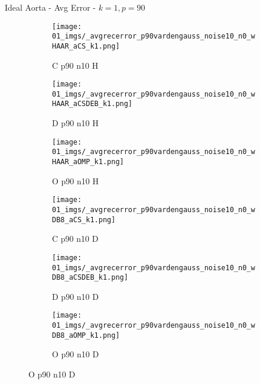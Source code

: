 \begin{frame}{Ideal Aorta - Avg Error - $k=1,p=90$}{}
\begin{figure}
\begin{subfigure}{0.13\textwidth}
\texttt{[image: 01\_imgs/\_avgrecerror\_p90vardengauss\_noise10\_n0\_wHAAR\_aCS\_k1.png]}
\caption*{\tiny C p90 n10 H}
\end{subfigure}
\begin{subfigure}{0.13\textwidth}
\texttt{[image: 01\_imgs/\_avgrecerror\_p90vardengauss\_noise10\_n0\_wHAAR\_aCSDEB\_k1.png]}
\caption*{\tiny D p90 n10 H}
\end{subfigure}
\begin{subfigure}{0.13\textwidth}
\texttt{[image: 01\_imgs/\_avgrecerror\_p90vardengauss\_noise10\_n0\_wHAAR\_aOMP\_k1.png]}
\caption*{\tiny O p90 n10 H}
\end{subfigure}
\begin{subfigure}{0.13\textwidth}
\texttt{[image: 01\_imgs/\_avgrecerror\_p90vardengauss\_noise10\_n0\_wDB8\_aCS\_k1.png]}
\caption*{\tiny C p90 n10 D}
\end{subfigure}
\begin{subfigure}{0.13\textwidth}
\texttt{[image: 01\_imgs/\_avgrecerror\_p90vardengauss\_noise10\_n0\_wDB8\_aCSDEB\_k1.png]}
\caption*{\tiny D p90 n10 D}
\end{subfigure}
\begin{subfigure}{0.13\textwidth}
\texttt{[image: 01\_imgs/\_avgrecerror\_p90vardengauss\_noise10\_n0\_wDB8\_aOMP\_k1.png]}
\caption*{\tiny O p90 n10 D}
\end{subfigure}

\vspace{5pt}


\end{figure}
\end{frame}
